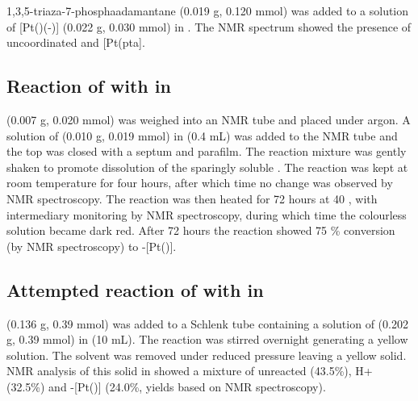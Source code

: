 1,3,5-triaza-7-phosphaadamantane (0.019 g, 0.120 mmol) was added to a solution of [Pt(\tButhixantphos)(-)] (0.022 g, 0.030 mmol) in .  The \phosphorus{} NMR spectrum showed the presence of uncoordinated \tButhixantphos{} and [Pt(pta].  


\subsection*{Reaction of \tButhixantphos{} with \ce{[Pt(C6H10)Cl2]} in }

\ce{[Pt(C6H10)Cl2]} (0.007 g, 0.020 mmol) was weighed into an NMR tube and placed under argon.  A solution of \tButhixantphos{} (0.010 g, 0.019 mmol) in  (0.4 mL) was added to the NMR tube and the top was closed with a septum and parafilm.  The reaction mixture was gently shaken to promote dissolution of the sparingly soluble \ce{[Pt(C6H10)Cl2]}.  The reaction was kept at room temperature for four hours, after which time no change was observed by NMR spectroscopy.  The reaction was then heated for 72 hours at 40 \degC, with intermediary monitoring by NMR spectroscopy, during which time the colourless solution became dark red.  After 72 hours the reaction showed 75 \% conversion (by \phosphorus{} NMR spectroscopy) to \trans-[Pt(\tBuxantphos)].

\subsection*{Attempted reaction of \tButhixantphos{} with \ce{[Pt(C6H10)Cl2]} in }

\ce{[Pt(C6H10)Cl2]} (0.136 g, 0.39 mmol) was added to a Schlenk tube containing a solution of  \tButhixantphos{} (0.202 g, 0.39 mmol) in  (10 mL).  The reaction was stirred overnight generating a yellow solution.  The solvent was removed under reduced pressure leaving a yellow solid.  NMR analysis of this solid in  showed a mixture of unreacted \tButhixantphos{} (43.5\%), \tButhixantphos H+ (32.5\%) and \trans-[Pt(\tButhixantphos)] (24.0\%, yields based on \phosphorus{} NMR spectroscopy).  

